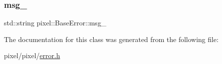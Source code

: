 \subsubsection{\texorpdfstring{msg\+\_\+}{msg\_}}
{\footnotesize\ttfamily std\+::string pixel\+::\+Base\+Error\+::msg\+\_\+\hspace{0.3cm}{\ttfamily [private]}}



The documentation for this class was generated from the following file\+:\begin{DoxyCompactItemize}
\item 
pixel/pixel/\hyperlink{error_8h}{error.\+h}\end{DoxyCompactItemize}
